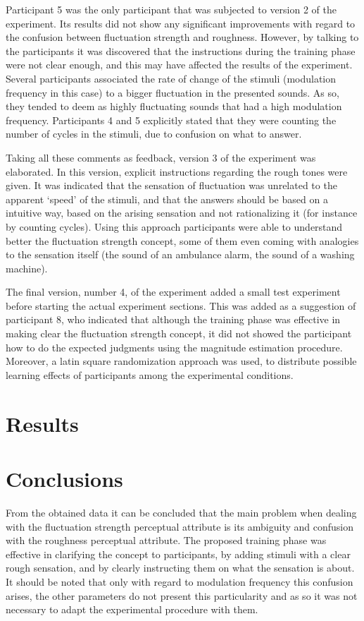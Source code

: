 \documentclass[../main.tex]{subfiles}
\begin{document}
Participant 5 was the only participant that was subjected to version 2 of the
experiment. Its results did not show any significant improvements with regard
to the confusion between fluctuation strength and roughness. However, by talking
to the participants it was discovered that the instructions during the training
phase were not clear enough, and this may have affected the results of the
experiment. Several participants associated the rate of change of the stimuli
(modulation frequency in this case) to a bigger fluctuation in the presented
sounds. As so, they tended to deem as highly fluctuating sounds that had a high
modulation frequency. Participants 4 and 5 explicitly stated that they were
counting the number of cycles in the stimuli, due to confusion on what to
answer.

Taking all these comments as feedback, version 3 of the experiment was
elaborated. In this version, explicit instructions regarding the rough tones
were given. It was indicated that the sensation of fluctuation was unrelated to
the apparent `speed' of the stimuli, and that the answers should be based on a
intuitive way, based on the arising sensation and not rationalizing it (for
instance by counting cycles). Using this approach participants were able to
understand better the fluctuation strength concept, some of them even coming
with analogies to the sensation itself (the sound of an ambulance alarm, the
sound of a washing machine).

The final version, number 4, of the experiment added a small test experiment
before starting the actual experiment sections. This was added as a suggestion
of participant 8, who indicated that although the training phase was effective
in making clear the fluctuation strength concept, it did not showed the
participant how to do the expected judgments using the magnitude estimation
procedure. Moreover, a latin square randomization approach was used, to
distribute possible learning effects of participants among the experimental
conditions.

\section{Results}



\section{Conclusions}

From the obtained data it can be concluded that the main problem when dealing
with the fluctuation strength perceptual attribute is its ambiguity and
confusion with the roughness perceptual attribute. The proposed training phase
was effective in clarifying the concept to participants, by adding stimuli with
a clear rough sensation, and by clearly instructing them on what the sensation
is about. It should be noted that only with regard to modulation frequency this
confusion arises, the other parameters do not present this particularity and as
so it was not necessary to adapt the experimental procedure with them.
\end{document}
